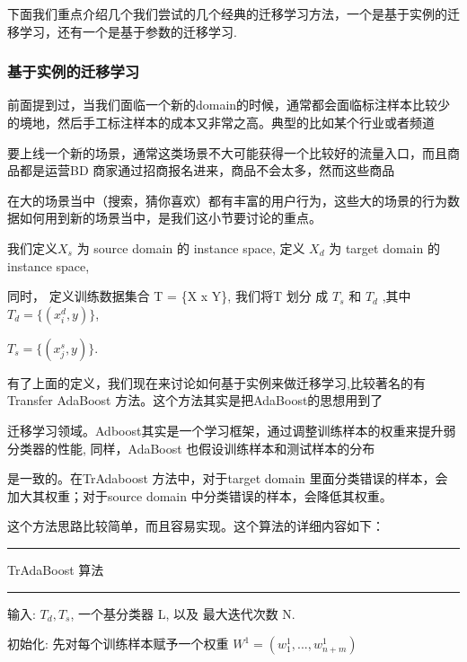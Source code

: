 下面我们重点介绍几个我们尝试的几个经典的迁移学习方法，一个是基于实例的迁移学习，还有一个是基于参数的迁移学习.


\subsubsection{基于实例的迁移学习}
前面提到过，当我们面临一个新的domain的时候，通常都会面临标注样本比较少的境地，然后手工标注样本的成本又非常之高。典型的比如某个行业或者频道

要上线一个新的场景，通常这类场景不大可能获得一个比较好的流量入口，而且商品都是运营BD 商家通过招商报名进来，商品不会太多，然而这些商品

在大的场景当中（搜索，猜你喜欢）都有丰富的用户行为，这些大的场景的行为数据如何用到新的场景当中，是我们这小节要讨论的重点。

我们定义$X_s$ 为 source domain 的 instance space, 定义 $X_d$ 为 target domain 的 instance space,



同时， 定义训练数据集合 T = \{X x Y\}, 我们将T 划分 成  $T_s$ 和 $T_d$ ,其中 $T_d = \{(x_i^d,y)\}$,

$T_s = \{(x_j^s,y)\}$.

有了上面的定义，我们现在来讨论如何基于实例来做迁移学习,比较著名的有Transfer AdaBoost 方法。这个方法其实是把AdaBoost的思想用到了

迁移学习领域。Adboost其实是一个学习框架，通过调整训练样本的权重来提升弱分类器的性能, 同样，AdaBoost 也假设训练样本和测试样本的分布

是一致的。在TrAdaboost 方法中，对于target domain 里面分类错误的样本，会加大其权重；对于source domain 中分类错误的样本，会降低其权重。

这个方法思路比较简单，而且容易实现。这个算法的详细内容如下：

\noindent\rule[0.25\baselineskip]{\textwidth}{1pt}
TrAdaBoost 算法 

\noindent\rule[0.25\baselineskip]{\textwidth}{1pt}

输入: $T_d, T_s$, 一个基分类器 L, 以及 最大迭代次数 N. 

初始化:  {先对每个训练样本赋予一个权重 $W^1 = (w_1^1,...,w_{n+m}^1)$}

